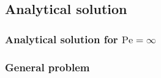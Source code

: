 
\subsection{Analytical solution}

\subsubsection{Analytical solution for $\mathrm{Pe} = \infty$}

\subsubsection{General problem}